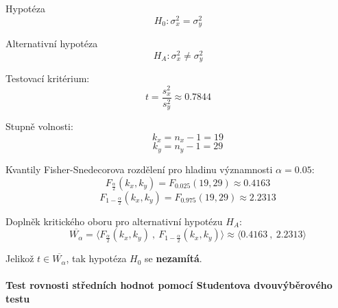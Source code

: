 \begin{compactitem}
    \item Hypotéza
    $${\displaystyle H_0 : \sigma_x^2 = \sigma_y^2}$$

    \item  Alternativní hypotéza
    $${\displaystyle H_A : \sigma_x^2 \neq \sigma_y^2}$$

    \item  Testovací kritérium:
    $${\displaystyle t = \frac{s_x^2}{s_y^2} \approx 0.7844}$$

    \item Stupně volnosti:
    $${\displaystyle \qquad k_x = n_x - 1 = 19}$$
    $${\displaystyle \qquad k_y = n_y - 1 = 29}$$

    \item Kvantily Fisher-Snedecorova rozdělení pro hladinu významnosti ${\displaystyle \alpha = 0.05}$:
    $${\displaystyle \qquad F_{\frac{\alpha}{2}} (k_x, k_y) = F_{0.025} (19, 29) \approx 0.4163}$$
    $${\displaystyle \qquad F_{1 - \frac{\alpha}{2}} (k_x, k_y) = F_{0.975} (19, 29) \approx 2.2313}$$

    \item  Doplněk kritického oboru pro alternativní hypotézu ${\displaystyle H_A}$:
    $${\displaystyle \qquad \overline{W_\alpha} = \big\langle F_{\frac{\alpha}{2}} (k_x, k_y) ~,~ F_{1 - \frac{\alpha}{2}} (k_x, k_y) \big\rangle \approx \big\langle 0.4163 ~,~ 2.2313 \big\rangle}$$

    \item Jelikož ${\displaystyle t \in \overline{W_\alpha}}$, tak hypotéza ${\displaystyle H_0}$ se \textbf{nezamítá}.
\end{compactitem}

\paragraph*{Test rovnosti středních hodnot pomocí Studentova dvouvýběrového testu}

